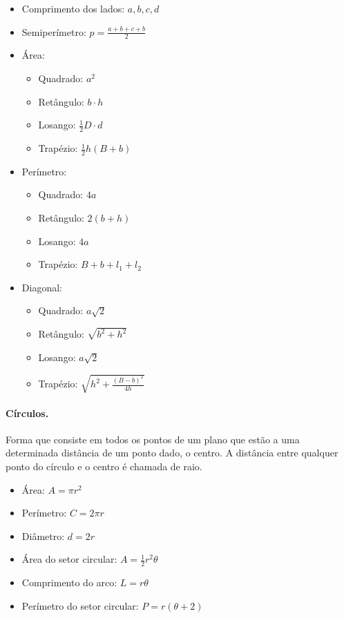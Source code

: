 \begin{multicols}{2}
	\begin{itemize}
		\item Comprimento dos lados: $a,b,c,d$
		\item Semiperímetro: $p = \frac{a+b+c+b}{2}$
		\item Área:
		\begin{itemize}
			\item Quadrado: $a^2$
			\item Retângulo: $b\cdot h$
			\item Losango: $\frac{1}{2}D \cdot d$
			\item Trapézio: $\frac{1}{2}h(B+b)$
		\end{itemize}
		\item Perímetro:
		\begin{itemize}
			\item Quadrado: $4a$
			\item Retângulo: $2(b+h)$
			\item Losango: $4a$
			\item Trapézio: $B+b+l_1+l_2$
		\end{itemize}
		\item Diagonal:
		\begin{itemize}
			\item Quadrado: $a\sqrt{2}$
			\item Retângulo: $\sqrt{b^2 + h^2}$
			\item Losango: $a\sqrt{2}$
			\item Trapézio: $\sqrt{h^2 + \frac{(B-b)^2}{4h}}$
		\end{itemize}
	\end{itemize}
\end{multicols}

\paragraph{Círculos.} Forma que consiste em todos os pontos de um plano que estão a uma determinada distância de um ponto dado, o centro. A distância entre qualquer ponto do círculo e o centro é chamada de raio.

\begin{multicols}{2}
	\begin{itemize}
		\item Área: $A = \pi r^2$
		\item Perímetro: $C = 2\pi r$
		\item Diâmetro: $d = 2r$
		\item Área do setor circular: $A = \frac{1}{2}r^2\theta$
		\item Comprimento do arco: $L = r\theta$
		\item Perímetro do setor circular: $P = r(\theta+2)$
	\end{itemize}
\end{multicols}

